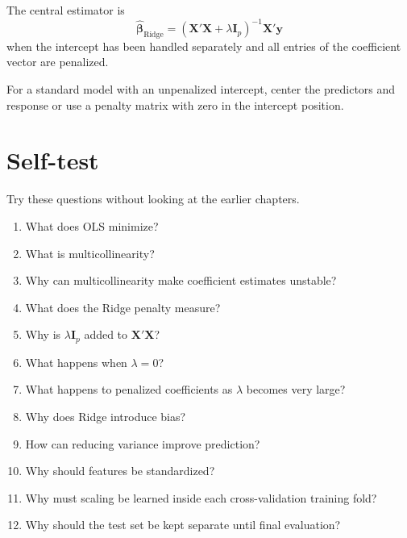 \documentclass[11pt,a4paper]{article}
\numberwithin{equation}{section}
\theoremstyle{remark}
\newcommand{\X}{\mathbf X}
\newcommand{\y}{\mathbf y}
\newcommand{\I}{\mathbf I}
\newcommand{\bhat}{\widehat{\boldsymbol{\beta}}}
\begin{document}
The central estimator is
\[
\boxed{
\bhat_{\mathrm{Ridge}}
=(\X'\X+\lambda\I_p)^{-1}\X'\y
}
\]
when the intercept has been handled separately and all entries of the
coefficient vector are penalized.

For a standard model with an unpenalized intercept, center the predictors
and response or use a penalty matrix with zero in the intercept position.

\section*{Self-test}
Try these questions without looking at the earlier chapters.

\begin{enumerate}
\item What does OLS minimize?
\item What is multicollinearity?
\item Why can multicollinearity make coefficient estimates unstable?
\item What does the Ridge penalty measure?
\item Why is $\lambda\I_p$ added to $\X'\X$?
\item What happens when $\lambda=0$?
\item What happens to penalized coefficients as $\lambda$ becomes very large?
\item Why does Ridge introduce bias?
\item How can reducing variance improve prediction?
\item Why should features be standardized?
\item Why must scaling be learned inside each cross-validation training fold?
\item Why should the test set be kept separate until final evaluation?
\end{enumerate}
\end{document}
